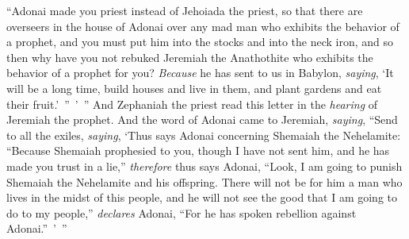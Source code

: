 \begin{biblechapter}
\verse “Adonai made you priest instead of Jehoiada the priest, so that there are overseers in the house of Adonai over any mad man who exhibits the behavior of a prophet, and you must put him into the stocks and into the neck iron,
\verse and so then why have you not rebuked Jeremiah the Anathothite who exhibits the behavior of a prophet for you?
\verse \textit{Because} he has sent to us in Babylon, \textit{saying}, ‘It will be a long time, build houses and live in them, and plant gardens and eat their fruit.’ ” ’ ”
\verse And Zephaniah the priest read this letter in the \textit{hearing} of Jeremiah the prophet.
 And the word of Adonai came to Jeremiah, \textit{saying},
\verse “Send to all the exiles, \textit{saying}, ‘Thus says Adonai concerning Shemaiah the Nehelamite: “Because Shemaiah prophesied to you, though I have not sent him, and he has made you trust in a lie,”
\verse \textit{therefore} thus says Adonai, “Look, I am going to punish Shemaiah the Nehelamite and his offspring. There will not be for him a man who lives in the midst of this people, and he will not see the good that I am going to do to my people,” \textit{declares} Adonai, “For he has spoken rebellion against Adonai.” ’ ”
\end{biblechapter}

